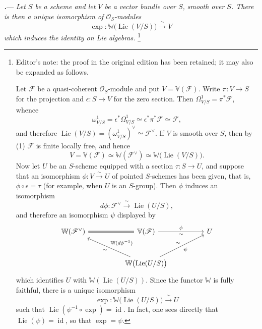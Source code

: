 \par\medskip\noindent
\textbf{\textit{.}}---
\textit{Let \(S\) be a scheme and let \(V\) be a vector bundle over
\(S\), smooth over \(S\).  There is then a unique isomorphism of
\(\mathcal O_S\)-modules}
\[
  \exp\colon
  \mathbb W\bigl(\operatorname{Lie}(V/S)\bigr)
  \xrightarrow{\ \sim\ } V
\]
\textit{which induces the identity on Lie algebras.}
\footnote{Editor's note: the proof in the original edition has been
retained; it may also be expanded as follows.

Let \(\mathscr F\) be a quasi-coherent \(\mathcal O_S\)-module and put
\(V=\mathbb V(\mathscr F)\).  Write \(\pi\colon V\to S\) for the
projection and \(\epsilon\colon S\to V\) for the zero section.  Then
\(\Omega^1_{V/S}=\pi^*\mathscr F\), whence
\[
  \tag{1}\label{sga3:xix:paragraph:4-1:equation:1}
  \omega^1_{V/S}
  =
  \epsilon^*\Omega^1_{V/S}
  \simeq
  \epsilon^*\pi^*\mathscr F
  \simeq
  \mathscr F,
\]
and therefore
\(\operatorname{Lie}(V/S)=(\omega^1_{V/S})^\vee
\simeq\mathscr F^\vee\).
If \(V\) is smooth over \(S\), then by \textup{(1)}
\(\mathscr F\) is finite locally free, and hence
\[
  \tag{2}\label{sga3:xix:paragraph:4-1:equation:2}
  V=\mathbb V(\mathscr F)
  \simeq
  \mathbb W(\mathscr F^\vee)
  \simeq
  \mathbb W\bigl(\operatorname{Lie}(V/S)\bigr).
\]
Now let \(U\) be an \(S\)-scheme equipped with a section
\(\tau\colon S\to U\), and suppose that an isomorphism
\(\phi\colon V\xrightarrow{\sim}U\) of pointed \(S\)-schemes has been
given, that is, \(\phi\circ\epsilon=\tau\) \textup{(for example, when
\(U\) is an \(S\)-group)}.  Then \(\phi\) induces an isomorphism
\[
  d\phi\colon
  \mathscr F^\vee
  \xrightarrow{\ \sim\ }
  \operatorname{Lie}(U/S),
\]
and therefore an isomorphism \(\psi\) displayed by
\[
\begin{tikzcd}[
  ampersand replacement=\&,
  column sep=huge,
  row sep=large
]
  \mathbb W(\mathscr F^\vee)
    \arrow[r,equal]
  \&
  \mathbb V(\mathscr F)
    \arrow[r,"\phi","\sim"']
  \&
  U
  \\
  \&
  \mathbb W\bigl(\operatorname{Lie}(U/S)\bigr)
    \arrow[ul,"\sim","\mathbb W(d\phi^{-1})"']
    \arrow[ur,"\sim","\psi"']
  \&
\end{tikzcd}
\]
which identifies \(U\) with
\(\mathbb W(\operatorname{Lie}(U/S))\).  Since the functor
\(\mathbb W\) is fully faithful, there is a unique isomorphism
\[
  \exp\colon
  \mathbb W\bigl(\operatorname{Lie}(U/S)\bigr)
  \xrightarrow{\ \sim\ }U
\]
such that
\(\operatorname{Lie}(\psi^{-1}\circ\exp)=\operatorname{id}\).
In fact, one sees directly that
\(\operatorname{Lie}(\psi)=\operatorname{id}\), so that
\(\exp=\psi\).}

